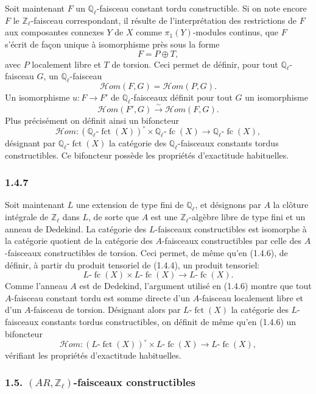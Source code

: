 \documentclass[11pt]{article}
\providecommand{\fct}{\operatorname{fct}}
\providecommand{\cHom}{\mathcal{H}om}
\providecommand{\fc}{\operatorname{fc}}
\begin{document}
Soit maintenant \(F\) un \(\mathbb Q_\ell\)-faisceau constant tordu constructible. Si on note encore \(F\) le \(\mathbb Z_\ell\)-faisceau correspondant, il résulte de l'interprétation des restrictions de \(F\) aux composantes connexes \(Y\) de \(X\) comme \(\pi_1(Y)\)-modules continus, que \(F\) s'écrit de façon unique à isomorphisme près sous la forme
\[
F=P\oplus T,
\]
avec \(P\) localement libre et \(T\) de torsion. Ceci permet de définir, pour tout \(\mathbb Q_\ell\)-faisceau \(G\), un \(\mathbb Q_\ell\)-faisceau
\[
\cHom(F,G)=\cHom(P,G).
\]
Un isomorphisme \(u:F\to F'\) de \(\mathbb Q_\ell\)-faisceaux définit pour tout \(G\) un isomorphisme
\[
\cHom(F',G)\xrightarrow{\sim}\cHom(F,G).
\]
Plus précisément on définit ainsi un bifoncteur
\[
\cHom:(\mathbb Q_\ell\text{-}\fct(X))^\circ\times \mathbb Q_\ell\text{-}\fc(X)
\longrightarrow \mathbb Q_\ell\text{-}\fc(X),
\]
désignant par \(\mathbb Q_\ell\text{-}\fct(X)\) la catégorie des \(\mathbb Q_\ell\)-faisceaux constants tordus constructibles. Ce bifoncteur possède les propriétés d'exactitude habituelles.

\subsubsection*{1.4.7}
Soit maintenant \(L\) une extension de type fini de \(\mathbb Q_\ell\), et désignons par \(A\) la clôture intégrale de \(\mathbb Z_\ell\) dans \(L\), de sorte que \(A\) est une \(\mathbb Z_\ell\)-algèbre libre de type fini et un anneau de Dedekind. La catégorie des \(L\)-faisceaux constructibles est isomorphe à la catégorie quotient de la catégorie des \(A\)-faisceaux constructibles par celle des \(A\)-faisceaux constructibles de torsion. Ceci permet, de même qu'en (1.4.6), de définir, à partir du produit tensoriel de (1.4.4), un produit tensoriel:
\[
L\text{-}\fc(X)\times L\text{-}\fc(X)\longrightarrow L\text{-}\fc(X).
\]
Comme l'anneau \(A\) est de Dedekind, l'argument utilisé en (1.4.6) montre que tout \(A\)-faisceau constant tordu est somme directe d'un \(A\)-faisceau localement libre et d'un \(A\)-faisceau de torsion. Désignant alors par \(L\text{-}\fct(X)\) la catégorie des \(L\)-faisceaux constants tordus constructibles, on définit de même qu'en (1.4.6) un bifoncteur
\[
\cHom:(L\text{-}\fct(X))^\circ\times L\text{-}\fc(X)
\longrightarrow L\text{-}\fc(X),
\]
vérifiant les propriétés d'exactitude habituelles.

\subsubsection*{1.5. \((AR,\mathbb Z_\ell)\)-faisceaux constructibles}
\end{document}
